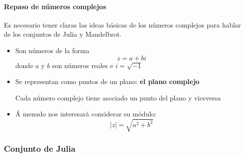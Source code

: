 \documentclass[8pt]{beamer}
\begin{document}
\begin{frame}
\framesubtitle{Repaso de números complejos}

Es necesario tener claras las ideas básicas de los números complejos para hablar de los conjuntos de Julia y Mandelbrot.

\begin{itemize}
\item Son números de la forma
\[z=a +bi\]
donde $a$ y $b$ son números reales e $i=\sqrt{-1}$
\item Se representan como puntos de un plano: \textbf{el plano complejo}

Cada número complejo tiene asociado un punto del plano y viceversa

\item Á menudo nos interesará considerar su módulo:
\[|z| = \sqrt{a^2+b^2}\]
\end{itemize}

\end{frame}

\subsubsection{Conjunto de Julia}
\end{document}
